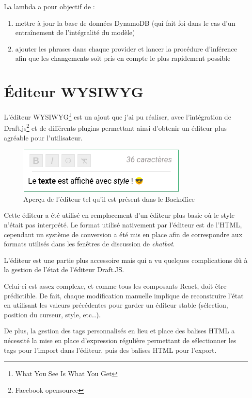 \documentclass[12pt,a4paper,oneside]{scrreprt}
\begin{document}
La lambda a pour objectif de :
\begin{enumerate}
	\item mettre à jour la base de données DynamoDB (qui fait foi dans le cas d'un entraînement de l'intégralité du modèle)
	\item ajouter les phrases dans chaque provider et lancer la procédure d'inférence afin que les changements soit pris en compte le plus rapidement possible
\end{enumerate}

\section{Éditeur WYSIWYG}

L'éditeur WYSIWYG\footnote{What You See Is What You Get} est un ajout que j'ai pu réaliser, avec l'intégration de Draft.js\footnote{Facebook opensource} et de différents plugins permettant ainsi d'obtenir un éditeur plus agréable pour l'utilisateur.

\begin{figure}[!ht]
	\centering
	\includegraphics[scale=0.75]{pictures/wysiwyg.png}
	\caption{Aperçu de l'éditeur tel qu'il est présent dans le Backoffice}
\end{figure}

Cette éditeur a été utilisé en remplacement d'un éditeur plus basic où le style n'était pas interprété. Le format utilisé nativement par l'éditeur est de l'HTML, cependant un système de conversion a été mis en place afin de correspondre aux formats utilisés dans les fenêtres de discussion de \textit{chatbot}.

\begin{info}
	L'éditeur est une partie plus accessoire mais qui a vu quelques complications dû à la gestion de l'état de l'éditeur Draft.JS.

	Celui-ci est assez complexe, et comme tous les composants React, doit être prédictible. De fait, chaque modification manuelle implique de reconstruire l'état en utilisant les valeurs précédentes pour garder un éditeur stable (sélection, position du curseur, style, etc\dots).

	De plus, la gestion des tags personnalisés en lieu et place des balises HTML a nécessité la mise en place d'expression régulière permettant de sélectionner les tags pour l'import dans l'éditeur, puis des balises HTML pour l'export.
\end{info}
\end{document}
